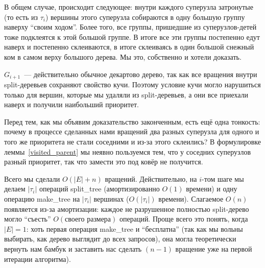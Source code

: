 В общем случае, происходит следующее: внутри каждого суперузла затронутые (то есть из $\tau_i$) вершины этого суперузла собираются в одну большую группу наверху ``своим ходом''. Более того, все группы, пришедшие из суперузлов-детей тоже подклеятся к этой большой группе. В итоге все эти группы постепенно едут наверх и постепенно склеиваются, в итоге склеиваясь в один большой снежный ком в самом верху большого дерева. Мы это, собственно и хотели доказать. 

$G_{i+1}$~--- действительно обычное декартово дерево, так как все вращения внутри split-деревьев сохраняют свойство кучи. Поэтому условие кучи могло нарушиться только для вершин, которые мы удаляли из split-деревьев, а они все 	приехали наверх и получили наибольший приоритет.

Перед тем, как мы объявим доказательство законченным, есть ещё одна тонкость:
почему в процессе сделанных нами вращений два разных суперузла для одного и того же приоритета не стали соседними и из-за этого склеились? В формулировке леммы~\ref{visited_parent} мы неявно пользуемся тем, что у соседних суперузлов разный приоритет, так что замести это под ковёр не получится.

Всего мы сделали $O(|E| + n)$ вращений. Действительно, на $i$-том шаге мы делаем $|\tau_i|$ операций \textrm{split\_tree} (амортизированно $O(1)$ времени) и одну операцию \textrm{make\_tree} на $|\tau_i|$ вершинах ($O(|\tau_i|)$ времени). Слагаемое $O(n)$ появляется из-за амортизации: каждое не разрушенное полностью split-дерево могло ``съесть'' $O(\texttt{своего размера})$ операций. Проще всего это понять, когда $|E| = 1$: хоть первая операция \textrm{make\_tree}  и ``бесплатна'' (так как мы вольны выбирать, как дерево выглядит до всех запросов), она могла теоретически вернуть нам бамбук и заставить нас сделать $(n-1)$ вращение уже на первой итерации алгоритма).